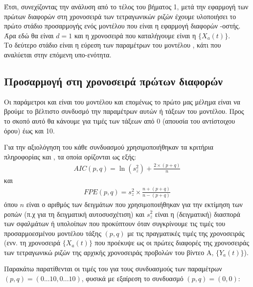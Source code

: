 Έτσι, συνεχίζοντας την ανάλυση από το τέλος του βήματος 1, μετά την εφαρμογή των πρώτων διαφορών στη χρονοσειρά των τετραγωνικών ριζών έχουμε υλοποιήσει το πρώτο στάδιο προσαρμογής ενός μοντέλου  που είναι η εφαρμογή διαφορών -οστής. Άρα εδώ θα είναι $d=1$ και η χρονοσειρά που καταλήγουμε είναι η $\{X_a(t)\}$.\\Το δεύτερο στάδιο είναι η εύρεση των παραμέτρων του μοντέλου , κάτι που αναλύεται στην επόμενη υπο-ενότητα. 

\subsection{Προσαρμογή  στη χρονοσειρά πρώτων διαφορών}

Οι παράμετροι  και  είναι  του μοντέλου και επομένως το πρώτο μας μέλημα είναι να βρούμε το βέλτιστο συνδυσμό την παραμέτρων αυτών ή τάξεων του μοντέλου. Προς το σκοπό αυτό θα κάνουμε  για τιμές των τάξεων από 0 (απουσία του αντίστοιχου  όρου) έως και 10.\par

Για την αξιολόγηση του κάθε συνδυασμού χρησιμοποιήθηκαν τα κριτήρια πληροφορίας  και , τα οποία ορίζονται ως εξής:
\begin{align}
AIC(p,q) = \ln{\left(s_z^2\right)} + \frac{2\times(p+q)}{n} 
\end{align}
και
\begin{align}
FPE(p,q) = s_z^2 \times \frac{n + (p+q)}{n - (p+q)}
\end{align}
όπου $n$ είναι ο αριθμός των δειγμάτων που χρησιμοποιήθηκαν για την εκτίμηση των ροπών (π.χ για τη δειγματική αυτοσυσχέτιση) και $s_z^2$ είναι η (δειγματική) διασπορά των σφαλμάτων ή υπολοίπων που προκύπτουν όταν συγκρίνουμε τις τιμές του προσαρμοεσμένου μοντέλου τάξης $(p,q)$ με τις πραγματικές τιμές της χρονοσειράς (ενν. τη χρονοσειρά $\{X_a(t)\}$ που προέκυψε ως οι πρώτες διαφορές της χρονοσειράς των τετραγωνικώ ριζών της αρχικής χρονοσειράς προβολών του βίντεο Α, $\{Y_a(t)\}$). \par

Παρακάτω παρατίθενται οι τιμές του  για τους συνδυασμούς των παραμέτρων $(p,q)=(0...10,0...10)$, φυσικά με εξαίρεση το συνδυασμό $(p,q)=(0,0)$:

